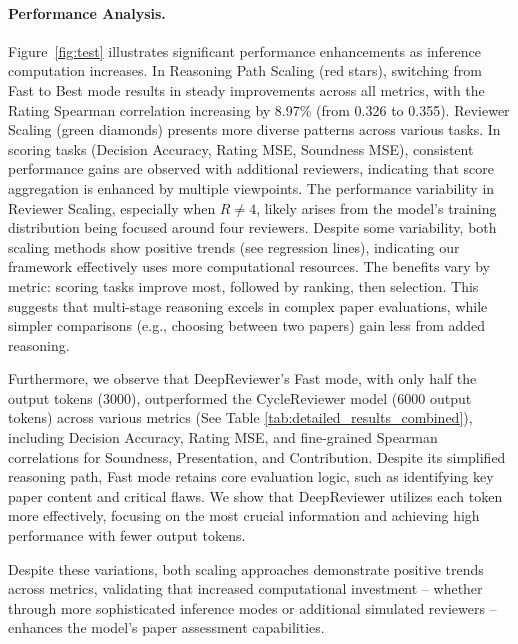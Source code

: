 \documentclass{article}
\begin{document}
\paragraph{Performance Analysis.} Figure~\ref{fig:test} illustrates significant performance enhancements as inference computation increases. In Reasoning Path Scaling (red stars), switching from Fast to Best mode results in steady improvements across all metrics, with the Rating Spearman correlation increasing by 8.97$\%$ (from 0.326 to 0.355). Reviewer Scaling (green diamonds) presents more diverse patterns across various tasks. In scoring tasks (Decision Accuracy, Rating MSE, Soundness MSE), consistent performance gains are observed with additional reviewers, indicating that score aggregation is enhanced by multiple viewpoints. The performance variability in Reviewer Scaling, especially when $R \neq 4$, likely arises from the model's training distribution being focused around four reviewers. Despite some variability, both scaling methods show positive trends (see regression lines), indicating our framework effectively uses more computational resources. The benefits vary by metric: scoring tasks improve most, followed by ranking, then selection. This suggests that multi-stage reasoning excels in complex paper evaluations, while simpler comparisons (e.g., choosing between two papers) gain less from added reasoning.

Furthermore, we observe that DeepReviewer's Fast mode, with only half the output tokens (3000), outperformed the CycleReviewer model (6000 output tokens) across various metrics (See Table \ref{tab:detailed_results_combined}), including Decision Accuracy, Rating MSE, and fine-grained Spearman correlations for Soundness, Presentation, and Contribution. Despite its simplified reasoning path, Fast mode retains core evaluation logic, such as identifying key paper content and critical flaws. We show that DeepReviewer utilizes each token more effectively, focusing on the most crucial information and achieving high performance with fewer output tokens.

Despite these variations, both scaling approaches demonstrate positive trends across metrics, validating that increased computational investment -- whether through more sophisticated inference modes or additional simulated reviewers -- enhances the model's paper assessment capabilities. 

\end{document}
